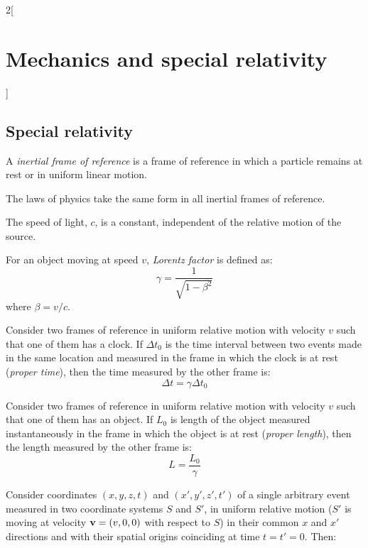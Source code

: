 \documentclass[../../../main.tex]{subfiles}
\begin{document}
\begin{multicols}{2}[\section{Mechanics and special relativity}]
    \subsection{Special relativity}
    \begin{definition}
        A \textit{inertial frame of reference} is a frame of reference in which a particle remains at rest or in uniform linear motion.
    \end{definition}
    \begin{principle}
        The laws of physics take the same form in all inertial frames of reference.
    \end{principle}
    \begin{principle}
        The speed of light, $c$, is a constant, independent of the relative motion of the source.
    \end{principle}
    \begin{definition}
        For an object moving at speed $v$, \textit{Lorentz factor} is defined as:
        $$\gamma=\frac{1}{\sqrt{1-\beta^2}}$$ where $\beta=v/c$.
    \end{definition}
    \begin{prop}
        Consider two frames of reference in uniform relative motion with velocity $v$ such that one of them has a clock. If $\Delta t_0$ is the time interval between two events made in the same location and measured in the frame in which the clock is at rest (\textit{proper time}), then the time measured by the other frame is:
        $$\Delta t=\gamma\Delta t_0$$
    \end{prop}
    \begin{prop}
        Consider two frames of reference in uniform relative motion with velocity $v$ such that one of them has an object. If $L_0$ is length of the object measured instantaneously in the frame in which the object is at rest (\textit{proper length}), then the length measured by the other frame is:
        $$L=\frac{L_0}{\gamma}$$
    \end{prop}
    \begin{prop}
        Consider coordinates $(x,y,z,t)$ and $(x',y',z',t')$ of a single arbitrary event measured in two coordinate systems $S$ and $S'$, in uniform relative motion ($S'$ is moving at velocity $\boldsymbol{\mathrm{v}}=(v,0,0)$ with respect to $S$) in their common $x$ and $x'$ directions and  with their spatial origins coinciding at time $t=t'=0$. Then:
        \begin{align*}

\end{align*}
\end{prop}
\end{multicols}
\end{document}
